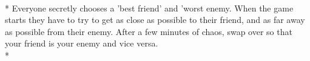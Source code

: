 \begin{minipage}{\textwidth}
\\*
Everyone secretly chooses a 'best friend' and 'worst enemy.  When the game starts they have to try to get as close as possible to their friend, and as far away as possible from their enemy.  After a few minutes of chaos, swap over so that your friend is your enemy and vice versa.\\*
\end{minipage}    \vfill
